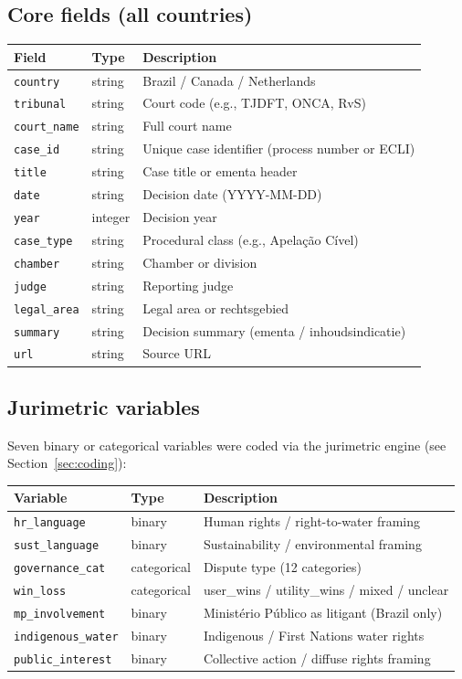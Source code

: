 \documentclass[12pt]{article}
\begin{document}
\subsection{Core fields (all countries)}

\begin{longtable}{@{}lll@{}}
\toprule
Field & Type & Description \\
\midrule
\texttt{country} & string & Brazil / Canada / Netherlands \\
\texttt{tribunal} & string & Court code (e.g., TJDFT, ONCA, RvS) \\
\texttt{court\_name} & string & Full court name \\
\texttt{case\_id} & string & Unique case identifier (process number or ECLI) \\
\texttt{title} & string & Case title or ementa header \\
\texttt{date} & string & Decision date (YYYY-MM-DD) \\
\texttt{year} & integer & Decision year \\
\texttt{case\_type} & string & Procedural class (e.g., Apelação Cível) \\
\texttt{chamber} & string & Chamber or division \\
\texttt{judge} & string & Reporting judge \\
\texttt{legal\_area} & string & Legal area or rechtsgebied \\
\texttt{summary} & string & Decision summary (ementa / inhoudsindicatie) \\
\texttt{url} & string & Source URL \\
\bottomrule
\end{longtable}

\subsection{Jurimetric variables}

Seven binary or categorical variables were coded via the jurimetric engine (see Section~\ref{sec:coding}):

\begin{longtable}{@{}lll@{}}
\toprule
Variable & Type & Description \\
\midrule
\texttt{hr\_language} & binary & Human rights / right-to-water framing \\
\texttt{sust\_language} & binary & Sustainability / environmental framing \\
\texttt{governance\_cat} & categorical & Dispute type (12 categories) \\
\texttt{win\_loss} & categorical & user\_wins / utility\_wins / mixed / unclear \\
\texttt{mp\_involvement} & binary & Ministério Público as litigant (Brazil only) \\
\texttt{indigenous\_water} & binary & Indigenous / First Nations water rights \\
\texttt{public\_interest} & binary & Collective action / diffuse rights framing \\
\bottomrule
\end{longtable}
\end{document}
